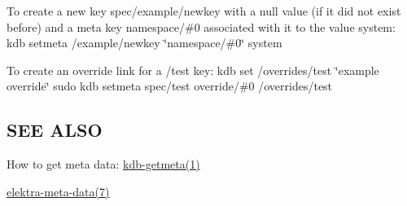 To create a new key {\ttfamily spec/example/newkey} with a null value (if it did not exist before) and a meta key {\ttfamily namespace/\#0} associated with it to the value {\ttfamily system}\+: {\ttfamily kdb setmeta /example/newkey \char`\"{}namespace/\#0\char`\"{} system}

To create an override link for a {\ttfamily /test} key\+: {\ttfamily kdb set /overrides/test \char`\"{}example override\char`\"{}} {\ttfamily sudo kdb setmeta spec/test override/\#0 /overrides/test}

\subsection*{S\+E\+E A\+L\+S\+O}


\begin{DoxyItemize}
\item How to get meta data\+: \hyperlink{md_doc_help_kdb-getmeta_doc_help_kdb-getmeta_md}{kdb-\/getmeta(1)}
\item \hyperlink{md_doc_help_elektra-meta-data_doc_help_elektra-meta-data_md}{elektra-\/meta-\/data(7)} 
\end{DoxyItemize}